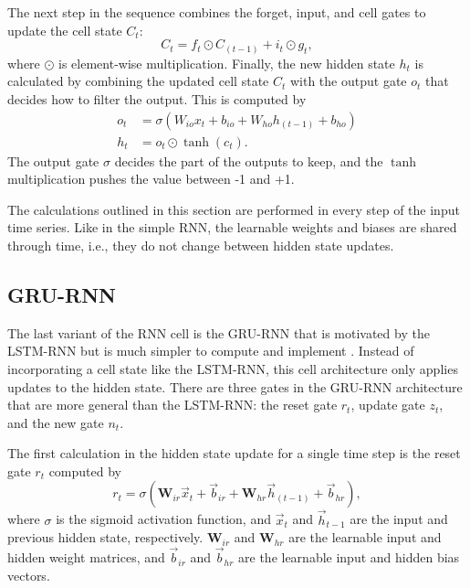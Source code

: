 The next step in the sequence combines the forget, input, and cell gates to update the cell state $C_{t}$:
\begin{equation} \label{eq:LSTM_update_cell_state}
	C_{t} = f_{t} \odot C_{\left(t-1\right)} + i_{t} \odot g_{t},
\end{equation}
where $\odot$ is element-wise multiplication. Finally, the new hidden state $h_{t}$ is calculated by combining the updated cell state $C_{t}$ with the output gate $o_{t}$ that decides how to filter the output. This is computed by
\begin{align}
o_{t} &= \sigma\left(W_{io}x_{t} + b_{io} + W_{ho}h_{\left(t-1\right)} + b_{ho}\right) \label{eq:LSTM_output_gate} \\
h_{t} &= o_{t} \odot \tanh\left(c_{t}\right). \label{eq:LSTM_updated_hidden_state}
\end{align}
The output gate $\sigma$ decides the part of the outputs to keep, and the $\tanh$ multiplication pushes the value between -1 and +1.

The calculations outlined in this section are performed in every step of the input time series. Like in the simple \ac{RNN}, the learnable weights and biases are shared through time, i.e., they do not change between hidden state updates.

\subsection{GRU-RNN}
The last variant of the \ac{RNN} cell is the \ac{GRU-RNN} that is motivated by the \ac{LSTM-RNN} but is much simpler to compute and implement \cite{GRU_original}. Instead of incorporating a cell state like the \ac{LSTM-RNN}, this cell architecture only applies updates to the hidden state. There are three gates in the \ac{GRU-RNN} architecture that are more general than the \ac{LSTM-RNN}: the reset gate $r_{t}$, update gate $z_{t}$, and the new gate $n_{t}$.

The first calculation in the hidden state update for a single time step is the reset gate $r_{t}$ computed by
\begin{equation} \label{eq:GRU_reset_gate}
	r_{t} = \sigma\left(\textbf{W}_{ir} \vec{x}_{t} + \vec{b}_{ir} + \textbf{W}_{hr} \vec{h}_{\left(t-1\right)} + \vec{b}_{hr}\right),
\end{equation}
where $\sigma$ is the sigmoid activation function, and $\vec{x}_{t}$ and $\vec{h}_{t-1}$ are the input and previous hidden state, respectively. $\textbf{W}_{ir}$ and $\textbf{W}_{hr}$ are the learnable input and hidden weight matrices, and $\vec{b}_{ir}$ and $\vec{b}_{hr}$ are the learnable input and hidden bias vectors.

